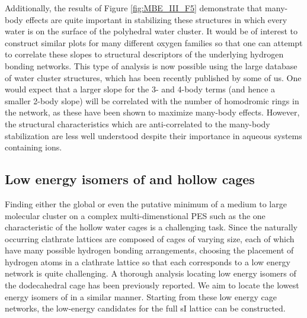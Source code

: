 \documentclass[11pt, proquest]{uwthesis}[2020/02/24]
\let\ce\ch
\begin{document}
\par Additionally, the results of Figure \ref{fig:MBE_III_F5} demonstrate that many-body effects are quite important in stabilizing these structures in which every water is on the surface of the polyhedral water cluster. It would be of interest to construct similar plots for many different oxygen families so that one can attempt to correlate these slopes to structural descriptors of the underlying hydrogen bonding networks. This type of analysis is now possible using the large database of water cluster structures, which has been recently published by some of us.\autocite{rakshit_atlas_2019} One would expect that a larger slope for the 3- and 4-body terms (and hence a smaller 2-body slope) will be correlated with the number of homodromic rings in the network, as these have been shown to maximize many-body effects.\autocite{xantheas_ab_1994,xantheas_cooperativity_2000} However, the structural characteristics which are anti-correlated to the many-body stabilization are less well understood despite their importance in aqueous systems containing ions.\autocite{heindel_many-body_2021,mherman_many-body_2021}

\subsection{Low energy isomers of \ce{(H2O)_{24}} and \ce{(H2O)_{28}} hollow cages}

\par Finding either the global or even the putative minimum of a medium to large molecular cluster on a complex multi-dimenstional PES such as the one characteristic of the hollow water cages is a challenging task.\autocite{wales_exploring_2018} Since the naturally occurring clathrate lattices are composed of cages of varying size, each of which have many possible hydrogen bonding arrangements, choosing the placement of hydrogen atoms in a clathrate lattice so that each corresponds to a low energy network is quite challenging. A thorough analysis locating low energy isomers of the \ce{(H2O)_{20}} dodecahedral cage has been previously reported.\autocite{xantheas_lowlying_2012} We aim to locate the lowest energy isomers of \ce{(H2O)_{24}} in a similar manner. Starting from these low energy cage networks, the low-energy candidates for the full sI lattice can be constructed.\autocite{yoo_low-energy_2009}


\end{document}

